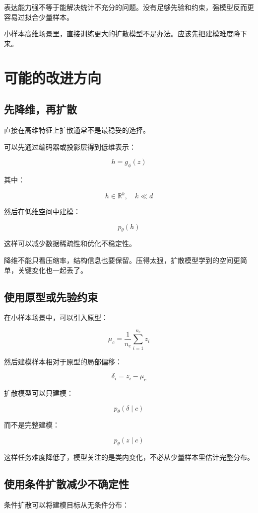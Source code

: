 表达能力强不等于能解决统计不充分的问题。没有足够先验和约束，强模型反而更容易过拟合少量样本。

小样本高维场景里，直接训练更大的扩散模型不是办法。应该先把建模难度降下来。

\section{可能的改进方向}

\subsection{先降维，再扩散}

直接在高维特征上扩散通常不是最稳妥的选择。

可以先通过编码器或投影层得到低维表示：

\[
h = g_\phi(z)
\]

其中：

\[
h \in \mathbb{R}^{k}, \quad k \ll d
\]

然后在低维空间中建模：

\[
p_\theta(h)
\]

这样可以减少数据稀疏性和优化不稳定性。

降维不能只看压缩率，结构信息也要保留。压得太狠，扩散模型学到的空间更简单，关键变化也一起丢了。

\subsection{使用原型或先验约束}

在小样本场景中，可以引入原型：

\[
\mu_c = \frac{1}{n_c}\sum_{i=1}^{n_c} z_i
\]

然后建模样本相对于原型的局部偏移：

\[
\delta_i = z_i - \mu_c
\]

扩散模型可以只建模：

\[
p_\theta(\delta \mid c)
\]

而不是完整建模：

\[
p_\theta(z \mid c)
\]

这样任务难度降低了，模型关注的是类内变化，不必从少量样本里估计完整分布。

\subsection{使用条件扩散减少不确定性}

条件扩散可以将建模目标从无条件分布：

